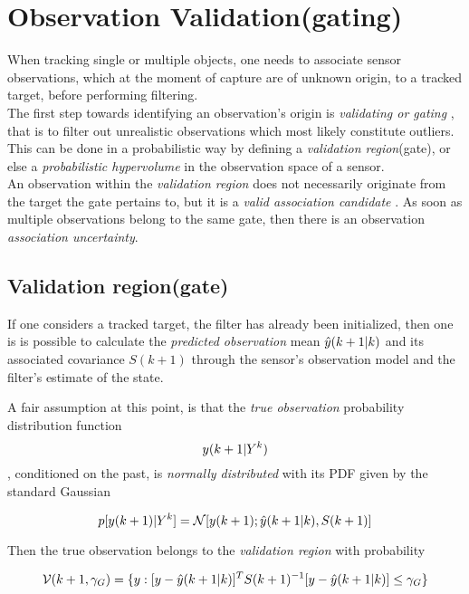 \section{Observation Validation(gating)}


When tracking single or multiple objects, one needs to associate sensor observations, which at the moment of capture are of unknown origin, to a tracked target, before performing filtering.\\


The first step towards identifying an observation's origin is \emph{validating or gating} , that is to filter out unrealistic observations which most likely constitute outliers. This can be done in a probabilistic way by defining a \emph{validation region}(gate), or else a \emph{probabilistic hypervolume} in the observation space of a sensor. \\


An observation within the \emph{validation region}  does not necessarily originate from the target the gate pertains to, but it is a \emph{valid association candidate} . As soon as multiple observations belong to the same gate, then there is an observation \emph{association uncertainty}.

\subsection{Validation region(gate)}

If one considers a tracked target, \ie the filter has already been initialized, then one is is possible to calculate the \emph{predicted observation} mean ${\hat{{y}}}(k+1|k)$ and its associated covariance $S(k+1)$ through the sensor's observation model and the filter's estimate of the state.


A fair assumption at this point, is that the \emph{true observation} probability distribution function $$ {y}(k+1| {Y}^k)$$, conditioned on the past, is \emph{normally distributed} with its PDF given by the standard Gaussian

$$
p[{y}(k+1)|{Y}^k] = \mathcal{N}[{y}(k+1); {\hat{{y}}}(k+1|k), S(k+1)]
$$



Then the true observation belongs to the \emph{validation region} with probability


\begin{equation}\label{eq:gateEquation}
\mathcal{V}(k+1, {\gamma_G}) = \{{y}: [{y}-{\hat{{y}}}(k+1|k)]^T S(k+1)^{-1} [{y}-{\hat{{y}}}(k+1|k)] \leq {\gamma_G} \}
\end{equation}


